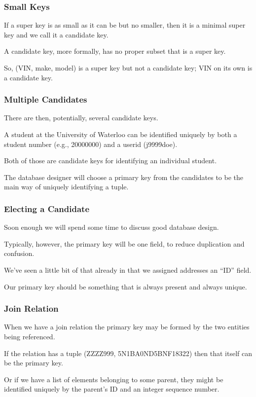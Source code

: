 \begin{frame}
\frametitle{Small Keys}

If a super key is as small as it can be but no smaller, then it is a minimal super key and we call it a \alert{candidate key}. 

A candidate key, more formally, has no proper subset that is a super key. 

So, (VIN, make, model) is a super key but not a candidate key; VIN on its own is a candidate key.

\end{frame}



\begin{frame}
\frametitle{Multiple Candidates}

There are then, potentially, several candidate keys. 

A student at the University of Waterloo can be identified uniquely by both a student number (e.g., 20000000) and a userid (j9999doe). 

Both of those are candidate keys for identifying an individual student. 

The database designer will choose a \alert{primary key} from the candidates to be the main way of uniquely identifying a tuple. 


\end{frame}



\begin{frame}
\frametitle{Electing a Candidate}

Soon enough we will spend some time to discuss good database design. 

Typically, however, the primary key will be one field, to reduce duplication and confusion. 

We've seen a little bit of that already in that we assigned addresses an ``ID'' field. 

Our primary key should be something that is always present and always unique.

\end{frame}




\begin{frame}
\frametitle{Join Relation}

When we have a join relation the primary key may be formed by the two entities being referenced. 

If the relation has a tuple (ZZZZ999, 5N1BA0ND5BNF18322) then that itself can be the primary key. 

Or if we have a list of elements belonging to some parent, they might be identified uniquely by the parent's ID and an integer sequence number.

\end{frame}




